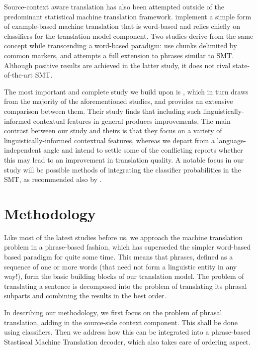 \documentclass[smallextended]{svjour3}       %
\theoremstyle{break}
\begin{document}
Source-context aware translation has also been attempted outside of the
predominant statistical machine translation framework. \cite{MBMT} implement a
simple form of example-based machine translation that is word-based and relies
chiefly on classifiers for the translation model component. Two studies derive
from the same concept while transcending a word-based paradigm:
\cite{MARKERBASED} use chunks delimited by common markers, and \cite{PBMBMT}
attempts a full extension to phrases similar to SMT. Although positive results
are achieved in the latter study, it does not rival state-of-the-art SMT.

The most important and complete study we build upon is \cite{Rejwanul+11},
which in turn draws from the majority of the aforementioned studies, and
provides an extensive comparison between them. Their study finds that including
such linguistically-informed contextual features in general produces
improvements.  The main contrast between our study and theirs is that they
focus on a variety of linguistically-informed contextual features, whereas we
depart from a language-independent angle and intend to settle some of the
conflicting reports whether this may lead to an improvement in translation
quality. A notable focus in our study will be possible methods of integrating the
classifier probabilities in the SMT, as recommended also by \cite{Gimenez+07}.


\section{Methodology}
\label{ref:methodology}

Like most of the latest studies before us, we approach the machine translation
problem in a phrase-based fashion, which has superseded the simpler word-based
based paradigm for quite some time. This means that phrases, defined as a
sequence of one or more words (that need not form a linguistic entity in any
way!), form the basic building blocks of our translation model. The problem of
translating a sentence is decomposed into the problem of translating its phrasal
subparts and combining the results in the best order.

In describing our methodology, we first focus on the problem of phrasal
translation, adding in the source-side context component. This shall be done
using classifiers. Then we address how this can be integrated into a
phrase-based Stastiscal Machine Translation decoder, which also takes care of
ordering aspect. 
\end{document}
